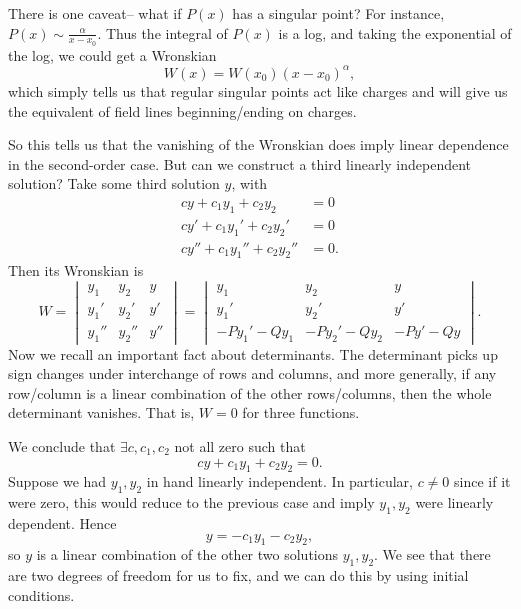 There is one caveat-- what if $P(x)$ has a singular point? For instance, $P(x) \sim \frac{\alpha}{x-x_0}$. Thus the integral of $P(x)$ is a log, and taking the exponential of the log, we could get a Wronskian
\begin{equation}
    W(x) = W(x_0)(x-x_0)^\alpha,
\end{equation}
which simply tells us that regular singular points act like charges and will give us the equivalent of field lines beginning/ending on charges.

So this tells us that the vanishing of the Wronskian does imply linear dependence in the second-order case. But can we construct a third linearly independent solution? Take some third solution $y$, with
\begin{align*}
    c y + c_1 y_1 + c_2 y_2 &= 0\\
    c y' + c_1 y_1' + c_2 y_2' &= 0\\
    c y'' + c_1 y_1'' + c_2 y_2'' &= 0.
\end{align*}
Then its Wronskian is
\begin{equation}
    W= \begin{vmatrix}
    y_1 & y_2 & y\\
    y_1' & y_2' & y'\\
    y_1'' & y_2'' & y''
    \end{vmatrix} =\begin{vmatrix}
    y_1 & y_2 & y\\
    y_1' & y_2' & y'\\
    -P y_1' -Q y_1 & -Py_2' - Q y_2 & -P y' - Q y
    \end{vmatrix}.
\end{equation}
Now we recall an important fact about determinants. The determinant picks up sign changes under interchange of rows and columns, and more generally, if any row/column is a linear combination of the other rows/columns, then the whole determinant vanishes. That is, $W=0$ for three functions.

We conclude that $\exists c,c_1,c_2$ not all zero such that
\begin{equation}
    c y + c_1 y_1 + c_2 y_2 = 0.
\end{equation}
Suppose we had $y_1,y_2$ in hand linearly independent. In particular, $c\neq 0$ since if it were zero, this would reduce to the previous case and imply $y_1,y_2$ were linearly dependent. Hence
\begin{equation}
    y = -c_1 y_1 - c_2 y_2,
\end{equation}
so $y$ is a linear combination of the other two solutions $y_1,y_2$. We see that there are two degrees of freedom for us to fix, and we can do this by using initial conditions.

